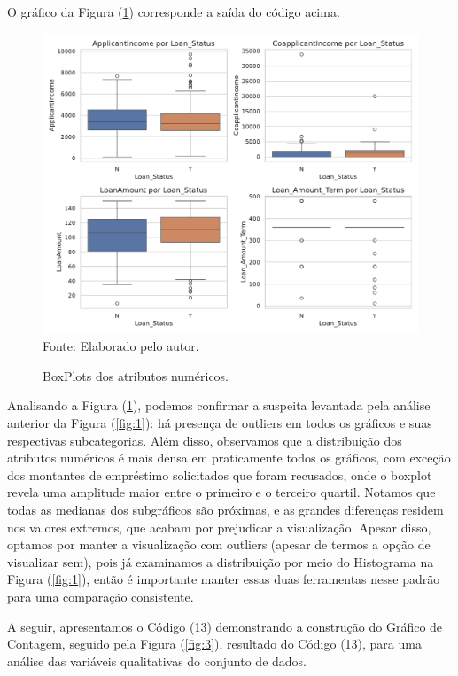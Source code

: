 \documentclass[a4paper,12pt]{article} %
\begin{document}
O gráfico da Figura (\ref{fig:2}) corresponde a saída do código acima.

\begin{figure}[H]
    \centering
    \caption{BoxPlots dos atributos numéricos.}
    \includegraphics[scale=0.65]{Figures/boxplot.pdf} \\
    Fonte: Elaborado pelo autor.
    \label{fig:2}
\end{figure}

Analisando a Figura (\ref{fig:2}), podemos confirmar a suspeita levantada pela análise anterior da Figura (\ref{fig:1}): há presença de outliers em todos os gráficos e suas respectivas subcategorias. Além disso, observamos que a distribuição dos atributos numéricos é mais densa em praticamente todos os gráficos, com exceção dos montantes de empréstimo solicitados que foram recusados, onde o boxplot revela uma amplitude maior entre o primeiro e o terceiro quartil. Notamos que todas as medianas dos subgráficos são próximas, e as grandes diferenças residem nos valores extremos, que acabam por prejudicar a visualização. Apesar disso, optamos por manter a visualização com outliers (apesar de termos a opção de visualizar sem), pois já examinamos a distribuição por meio do Histograma na Figura (\ref{fig:1}), então é importante manter essas duas ferramentas nesse padrão para uma comparação consistente.

A seguir, apresentamos o Código (13) demonstrando a construção do Gráfico de Contagem, seguido pela Figura (\ref{fig:3}), resultado do Código (13), para uma análise das variáveis qualitativas do conjunto de dados.
\end{document}
